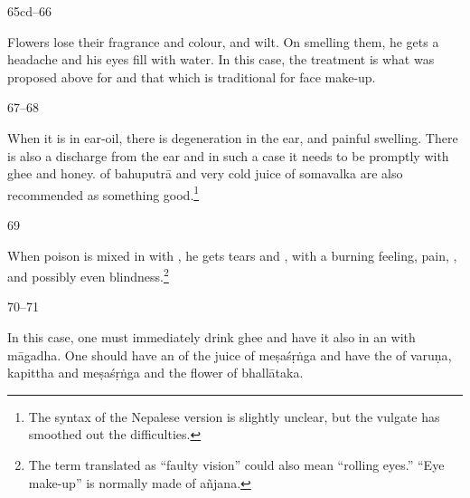\begin{translation}
\item[65cd--66]

Flowers lose their fragrance and colour, and wilt. On smelling them, he gets a
headache and his eyes fill with water.  In this case, the treatment is what was
proposed above for  and that which is traditional for face
make-up.


\item[67--68]

When it is in ear-oil, there is  degeneration in the ear, and painful swelling.
There is also a discharge from the ear and in such a case it needs to be
 promptly with ghee and honey.  
 of \gls{bahuputrā} and  very cold juice of
\gls{somavalka} are also  recommended as 
something good.\footnote{The syntax of the Nepalese version is slightly unclear, 
but the vulgate has smoothed out the difficulties.}


\item[69]


When poison is mixed in with , he gets tears and
, with a burning feeling, pain, , and possibly even blindness.\footnote{The term translated as  “faulty
vision” could also mean “rolling eyes.” “Eye make-up” is normally made of  
\gls{añjana}.}

\item[70--71]

In this case, one must immediately drink ghee and have it also
in an  with
\gls{māgadha}.
%
One should have an  of the juice of
\gls{meṣaśṛṅga}
and have the  of 
\gls{varuṇa},
\gls{kapittha} and 
\gls{meṣaśṛṅga}
and the flower of 
\gls{bhallātaka}.


\end{translation}
